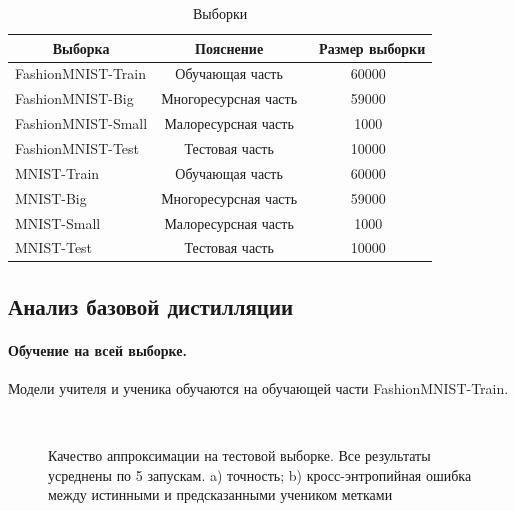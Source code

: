 \begin{table}[h!t]
\begin{center}
\caption{Выборки}
\label{table_1}
\begin{tabular}{|c|c|c|}
\hline
	Выборка & Пояснение &\ Размер выборки\\
	\hline
	\multicolumn{1}{|l|}{FashionMNIST-Train}
	& Обучающая часть& 60000\\
	\hline
	\multicolumn{1}{|l|}{FashionMNIST-Big}
	& Многоресурсная часть& 59000\\
	\hline
	\multicolumn{1}{|l|}{FashionMNIST-Small}
	& Малоресурсная часть& 1000\\
	\hline
	\multicolumn{1}{|l|}{FashionMNIST-Test}
	& Тестовая часть& 10000\\
	\hline
	\multicolumn{1}{|l|}{MNIST-Train}
	& Обучающая часть& 60000\\
	\hline
	\multicolumn{1}{|l|}{MNIST-Big}
	& Многоресурсная часть& 59000\\
	\hline
	\multicolumn{1}{|l|}{MNIST-Small}
	& Малоресурсная часть& 1000\\
	\hline
	\multicolumn{1}{|l|}{MNIST-Test}
	& Тестовая часть& 10000\\
\hline

\end{tabular}
\end{center}
\end{table}

\newpage
\subsection{Анализ базовой дистилляции}

\paragraph{Обучение на всей выборке.}
Модели учителя и ученика обучаются на обучающей части FashionMNIST-Train.

\begin{figure}[h!t]\center
{}
\\
\caption{Качество аппроксимации на тестовой выборке. Все результаты усреднены по 5 запускам. a) точность; b) кросс-энтропийная ошибка между истинными и предсказанными учеником метками}
\end{figure}

